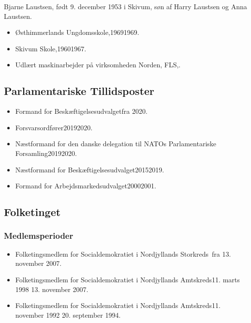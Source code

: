 \documentclass[11pt, a4paper]{awesome-cv}
\begin{document}
\makecvheader[R]
\makelettertitle
\begin{cvletter}
Bjarne Laustsen, født 9. december 1953 i Skivum, søn af Harry Laustsen og Anna Laustsen.

\begin{itemize}
\item Østhimmerlands Ungdomsskole,19691969.
\item Skivum Skole,19601967.
\item Udlært maskinarbejder på virksomheden Norden, FLS,.
\end{itemize}
\subsection*{Parlamentariske Tillidsposter}
\begin{itemize}
\item Formand for Beskæftigelsesudvalgetfra 2020.
\item Forsvarsordfører20192020.
\item Næstformand for den danske delegation til NATOs Parlamentariske Forsamling20192020.
\item Næstformand for Beskæftigelsesudvalget20152019.
\item Formand for Arbejdsmarkedsudvalget20002001.
\end{itemize}
\subsection*{Folketinget}
\subsubsection*{Medlemsperioder}
\begin{itemize}
\item Folketingsmedlem for Socialdemokratiet i Nordjyllands Storkreds fra 13. november 2007.
\item Folketingsmedlem for Socialdemokratiet i Nordjyllands Amtskreds11. marts 1998  13. november 2007.
\item Folketingsmedlem for Socialdemokratiet i Nordjyllands Amtskreds11. november 1992  20. september 1994.
\end{itemize}

\end{cvletter}
\end{document}
